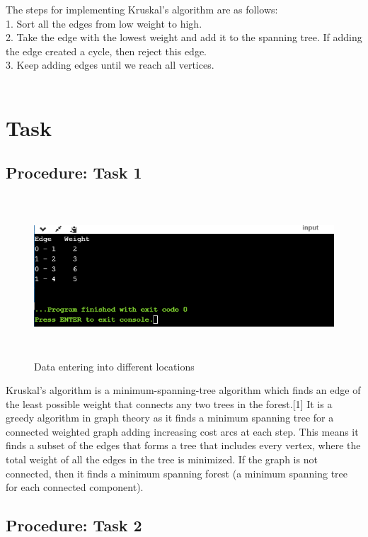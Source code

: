 \documentclass[12pt]{article}            %
\begin{document}
The steps for implementing Kruskal's algorithm are as follows: \\

1. Sort all the edges from low weight to high.\\
2. Take the edge with the lowest weight and add it to the spanning tree. If adding the edge created a cycle, then reject this edge.\\
3. Keep adding edges until we reach all vertices.\\ \\

\section{Task}  
\subsection{Procedure: Task 1 }     

\begin{figure}
\centering
  \includegraphics[width=12cm,height=6cm,keepaspectratio]{4.png}
\caption{Data entering into different locations}
\label{Figure:3}    
\end{figure}
Kruskal's algorithm is a minimum-spanning-tree algorithm which finds an edge of the least possible weight that connects any two trees in the forest.[1] It is a greedy algorithm in graph theory as it finds a minimum spanning tree for a connected weighted graph adding increasing cost arcs at each step. This means it finds a subset of the edges that forms a tree that includes every vertex, where the total weight of all the edges in the tree is minimized. If the graph is not connected, then it finds a minimum spanning forest (a minimum spanning tree for each connected component).

\subsection{Procedure: Task 2 }     
\end{document}
